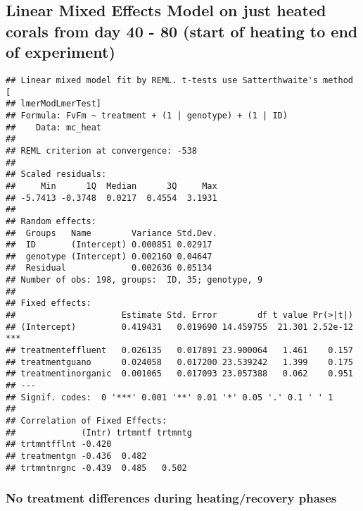 \documentclass[
]{article}
\newenvironment{Shaded}{\begin{snugshade}}{\end{snugshade}}
\newcommand{\AttributeTok}[1]{\textcolor[rgb]{0.13,0.29,0.53}{#1}}
\newcommand{\CommentTok}[1]{\textcolor[rgb]{0.56,0.35,0.01}{\textit{#1}}}
\newcommand{\DecValTok}[1]{\textcolor[rgb]{0.00,0.00,0.81}{#1}}
\newcommand{\FunctionTok}[1]{\textcolor[rgb]{0.13,0.29,0.53}{\textbf{#1}}}
\newcommand{\NormalTok}[1]{#1}
\newcommand{\OtherTok}[1]{\textcolor[rgb]{0.56,0.35,0.01}{#1}}
\newcommand{\SpecialCharTok}[1]{\textcolor[rgb]{0.81,0.36,0.00}{\textbf{#1}}}
\newcommand{\StringTok}[1]{\textcolor[rgb]{0.31,0.60,0.02}{#1}}
\begin{document}
\hypertarget{linear-mixed-effects-model-on-just-heated-corals-from-day-40---80-start-of-heating-to-end-of-experiment-1}{%
\subsection{Linear Mixed Effects Model on just heated corals from day 40
- 80 (start of heating to end of
experiment)}\label{linear-mixed-effects-model-on-just-heated-corals-from-day-40---80-start-of-heating-to-end-of-experiment-1}}

\begin{Shaded}
\end{Shaded}

\begin{verbatim}
## Linear mixed model fit by REML. t-tests use Satterthwaite's method [
## lmerModLmerTest]
## Formula: FvFm ~ treatment + (1 | genotype) + (1 | ID)
##    Data: mc_heat
## 
## REML criterion at convergence: -538
## 
## Scaled residuals: 
##     Min      1Q  Median      3Q     Max 
## -5.7413 -0.3748  0.0217  0.4554  3.1931 
## 
## Random effects:
##  Groups   Name        Variance Std.Dev.
##  ID       (Intercept) 0.000851 0.02917 
##  genotype (Intercept) 0.002160 0.04647 
##  Residual             0.002636 0.05134 
## Number of obs: 198, groups:  ID, 35; genotype, 9
## 
## Fixed effects:
##                     Estimate Std. Error        df t value Pr(>|t|)    
## (Intercept)         0.419431   0.019690 14.459755  21.301 2.52e-12 ***
## treatmenteffluent   0.026135   0.017891 23.900064   1.461    0.157    
## treatmentguano      0.024058   0.017200 23.539242   1.399    0.175    
## treatmentinorganic  0.001065   0.017093 23.057388   0.062    0.951    
## ---
## Signif. codes:  0 '***' 0.001 '**' 0.01 '*' 0.05 '.' 0.1 ' ' 1
## 
## Correlation of Fixed Effects:
##             (Intr) trtmntf trtmntg
## trtmntfflnt -0.420                
## treatmentgn -0.436  0.482         
## trtmntnrgnc -0.439  0.485   0.502
\end{verbatim}

\hypertarget{no-treatment-differences-during-heatingrecovery-phases}{%
\subsubsection{No treatment differences during heating/recovery
phases}\label{no-treatment-differences-during-heatingrecovery-phases}}
\end{document}

